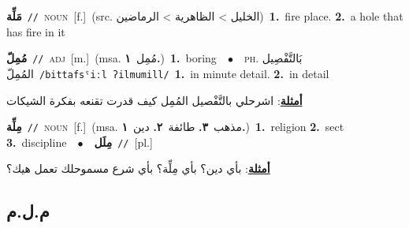 \documentclass[10pt,a4paper,twoside]{article} %
\begin{document}
\begin{multicols}{2}
{\setlength\topsep{0pt}\textbf{\foreignlanguage{arabic}{مَلِّة}}\ {\color{gray}\texttt{//}\color{black}}\ \textsc{noun}\ [f.]\ (src. \color{gray}\foreignlanguage{arabic}{الخليل > الظاهرية > الرماضين}\color{black})\ \textbf{1.}~fire place.  \textbf{2.}~a hole that has fire in it\ } \vspace{2mm}

{\setlength\topsep{0pt}\textbf{\foreignlanguage{arabic}{مُمِلّ}}\ {\color{gray}\texttt{//}\color{black}}\ \textsc{adj}\ [m.]\ \color{gray}(msa. \foreignlanguage{arabic}{مُمِل}~\foreignlanguage{arabic}{\textbf{١.}})\color{black}\ \textbf{1.}~boring\ \ $\bullet$\ \ \textsc{ph.} \color{gray} \foreignlanguage{arabic}{بَالتَّفْصِيل المُمِلّ}\color{black}\ {\color{gray}\texttt{/{\sffamily bittafsˤiːl ʔilmumill}/}\color{black}}\ \textbf{1.}~in minute detail.  \textbf{2.}~in detail\  \begin{flushright}\color{gray}\foreignlanguage{arabic}{\textbf{\underline{\foreignlanguage{arabic}{أمثلة}}}: اشرحلي بالتَّفْصيل المُمِل كيف قدرت تقنعه بفكرة الشيكات}\end{flushright}\color{black}} \vspace{2mm}

{\setlength\topsep{0pt}\textbf{\foreignlanguage{arabic}{مِلِّة}}\ {\color{gray}\texttt{//}\color{black}}\ \textsc{noun}\ [f.]\ \color{gray}(msa. \foreignlanguage{arabic}{مذهب}~\foreignlanguage{arabic}{\textbf{٣.}}  \foreignlanguage{arabic}{طائفة}~\foreignlanguage{arabic}{\textbf{٢.}}  \foreignlanguage{arabic}{دين}~\foreignlanguage{arabic}{\textbf{١.}})\color{black}\ \textbf{1.}~religion  \textbf{2.}~sect  \textbf{3.}~discipline\ \ $\bullet$\ \ \setlength\topsep{0pt}\textbf{\foreignlanguage{arabic}{مِلَل}}\ {\color{gray}\texttt{//}\color{black}}\ [pl.]\  \begin{flushright}\color{gray}\foreignlanguage{arabic}{\textbf{\underline{\foreignlanguage{arabic}{أمثلة}}}: بأي دين؟ بأي مِلِّة؟ بأي شرع مسموحلك تعمل هيك؟}\end{flushright}\color{black}} \vspace{2mm}

\vspace{-3mm}
\subsection*{\color{blue}\foreignlanguage{arabic}{م.ل.م}\color{blue}{}} 


\end{multicols}
\end{document}
